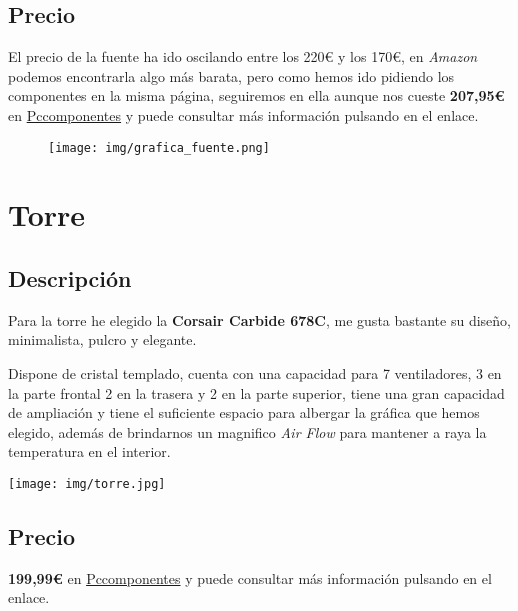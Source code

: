 \documentclass{article}
\begin{document}
      \subsection{Precio}
        El precio de la fuente ha ido oscilando entre los 220€ y los 170€, en \textit{Amazon} podemos encontrarla algo más barata, pero como hemos ido pidiendo los componentes en la misma página, seguiremos en ella aunque nos cueste
        \textbf{207,95€} en 
        \href{https://www.pccomponentes.com/gigabyte-amd-radeon-rx-5700-xt-gaming-oc-8gb-gddr6}{Pccomponentes} y puede consultar más información pulsando en el enlace.
        
        \begin{figure}[h]
          \centering
          \texttt{[image: img/grafica\_fuente.png]}
        \end{figure}
          

  \newpage
    \section{Torre}
      \subsection{Descripción}
        Para la torre he elegido la \textbf{Corsair Carbide 678C}, me gusta bastante su diseño, minimalista, pulcro y elegante.
        \\
        \begin{minipage}{0.5\textwidth}
          Dispone de cristal templado, cuenta con una capacidad para 7 ventiladores, 3 en la parte frontal 2 en la trasera y 2 en la parte superior, tiene una gran capacidad de ampliación y tiene el suficiente espacio
          para albergar la gráfica que hemos elegido, además de brindarnos un magnifico \textit{Air Flow} para mantener a raya la temperatura en el interior.
        \end{minipage}
        \begin{minipage}{\textwidth}
          \texttt{[image: img/torre.jpg]}
        \end{minipage}
      \subsection{Precio}
        
        \textbf{199,99€} en 
        \href{https://www.pccomponentes.com/gigabyte-amd-radeon-rx-5700-xt-gaming-oc-8gb-gddr6}{Pccomponentes} y puede consultar más información pulsando en el enlace.
        
\end{document}

